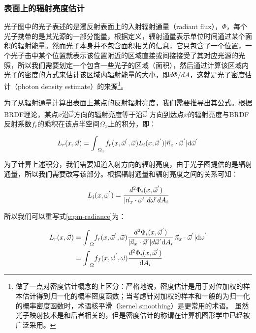 \subsubsection{表面上的辐射亮度估计}\label{sec:pm-radiance-estimate-at-a-surface}
光子图中的光子表述的是漫反射表面上的入射辐射通量（radiant flux），$\Phi$，每个光子携带的是其光源的一部分能量，根据定义，辐射通量表示单位时间通过某个面积的辐射能量。然而光子本身并不包含面积相关的信息，它只包含了一个位置，一个光子击中某个位置就表示该位置附近的区域直接或间接接受了其对应光源的光照，所以我们需要划定一个包含一些光子的区域（面积），然后通过计算该区域内光子的密度的方式来估计该区域内辐射能量的大小，即$d\Phi /dA$，这就是光子密度估计（photon density estimate）的来源\footnote{\cite{b:pbrt}做了一点对密度估计概念的上区分：严格地说，密度估计是用于对位加权的样本估计得到归一化的概率密度函数；当考虑针对加权的样本和一般的为归一化的概率密度函数时，术语核平滑（kernel smoothing）是更常用的术语。 虽然光子映射技术是和后者相关的，但是密度估计的称谓在计算机图形学中已经被广泛采用。}。

为了从辐射通量计算出表面上某点的反射辐射亮度，我们需要推导出其公式。根据BRDF理论，某点$x$沿$\vec{\omega}$方向的辐射亮度等于沿$\vec{\omega}^{'}$方向到达点$x$的辐射亮度与BRDF反射系数$f_r$的乘积在该点半空间$\Omega_x$上的积分，即：

\begin{equation}\label{e:pm-radiance}
	L_r(x,\vec{\omega})={\rm \int}_{\Omega_x} f_r(x,\vec{\omega}^{'},\vec{\omega})L_i(x,\vec{\omega}^{'})|\vec{n}_x\cdot\vec{\omega}^{'}|{\rm d}\vec{\omega}^{'}
\end{equation}

为了计算上述积分，我们需要知道入射方向的辐射亮度，由于光子图提供的是辐射通量，所以我们需要改写该部分。根据辐射通量和辐射亮度之间的关系可知：

\begin{equation}
	L_i(x,\vec{\omega}^{'})= \cfrac{d^{2}\Phi_i(x,\vec{\omega}^{'})}{|\vec{n}_x\cdot\vec{\omega}^{'}|d\vec{\omega}^{'} dA_i}	
\end{equation}

\noindent 所以我们可以重写式\ref{e:pm-radiance}为：

\begin{equation}
\begin{aligned}
	L_r(x,\vec{\omega})&={\rm \int}_\Omega f_r(x,\vec{\omega}^{'},\vec{\omega})  \cfrac{d^{2}\Phi_i(x,\vec{\omega}^{'})}{|\vec{n}_x\cdot\vec{\omega}^{'}|d\vec{\omega}^{'} {\rm d}A_i}    |\vec{n}_x\cdot\vec{\omega}^{'}|{\rm d}\omega^{'}\\
	&={\rm \int}_\Omega f_f(x,\vec{\omega}^{'},\vec{\omega})  \cfrac{d^{2}\Phi_i(x,\vec{\omega}^{'})}{{\rm d}A_i} 
\end{aligned}
\end{equation}

